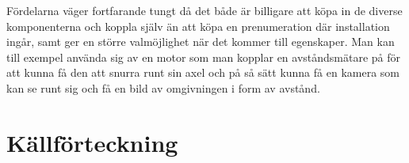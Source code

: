 \documentclass{article}
\begin{document}
Fördelarna väger fortfarande tungt då det både är billigare att köpa in de diverse komponenterna och koppla själv än att köpa en prenumeration där installation ingår, 
samt ger en större valmöjlighet när det kommer till egenskaper. 
Man kan till exempel använda sig av en motor som man kopplar en avståndsmätare på för att kunna få den att snurra runt sin axel och på så sätt kunna få en kamera som kan se runt sig och få en bild av omgivningen i form av avstånd.

\newpage
\section{Källförteckning}
\printbibliography[heading=none]
\end{document}
